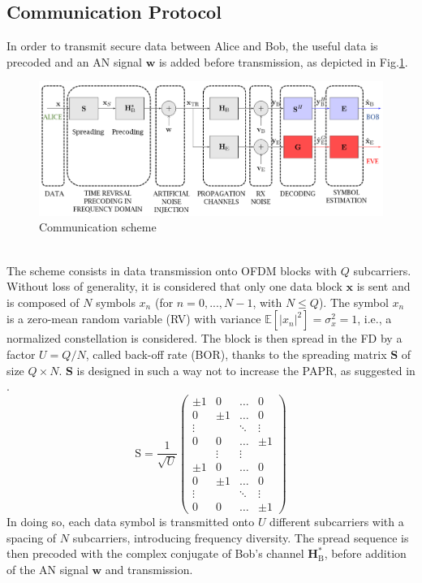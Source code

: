 \documentclass[journal,comsoc]{IEEEtran}
\let\MYoriglatexcaption\caption
\renewcommand{\caption}[2][\relax]{\MYoriglatexcaption[#2]{#2}}
\newcommand{\EX}[1]{\mathbb{E} \left[#1\right]}%
\newcommand{\HB}{\textbf{H}_{\text{B}}}
\newcommand{\spread}{\textbf{S}}
\newcommand{\w}{\textbf{w}}
\newcommand{\mat}[1]{\boldsymbol{\mathrm{#1}}}
\begin{document}
\subsection{Communication Protocol}\label{sec:communication-protocol}
In order to transmit secure data between Alice and Bob, the useful data is precoded and an AN signal $\w$ is added before transmission, as depicted in Fig.\ref{fig_com_scheme}.  
\begin{figure}[h!t]
	\centering
	\includegraphics[width=1\linewidth]{graphs/com_scheme_an.PNG}
	\caption{Communication scheme}
	\label{fig_com_scheme}
\end{figure}\\
The scheme consists in data transmission onto OFDM blocks with $Q$ subcarriers. Without loss of generality, it is considered that only one data block $\textbf{x}$ is sent and is composed of $N$ symbols $x_n$ (for $n = 0,..., N-1$, with $N\leq Q$). The symbol $x_n$ is  a zero-mean random variable (RV) with variance $\EX{|x_n|^2} = \sigma_x^2 = 1$, i.e., a normalized constellation is considered. The block is then spread in the FD by a factor $U = Q/N$, called back-off rate (BOR), thanks to the spreading matrix $\spread$ of size $Q\times N$. \textbf{S} is designed in such a way not to increase the PAPR, as suggested in \cite{4394231}.
\begin{equation}
\mat{S} = \frac{1}{\sqrt{U}} 
\begin{pmatrix}
\pm 1 & 0 & \hdots & 0 \\
0 & \pm 1 & \hdots & 0 \\
\vdots & & \ddots & \vdots \\
0 & 0 & \hdots & \pm 1 \\
& \vdots& \vdots& \\
\pm 1 & 0 & \hdots & 0 \\
0 & \pm 1 & \hdots & 0 \\
\vdots & & \ddots & \vdots \\
0 & 0 & \hdots & \pm 1
\end{pmatrix}
\label{eq:spread_mat}
\end{equation}
In doing so, each data symbol is transmitted onto $U$ different subcarriers with a spacing of $N$ subcarriers, introducing frequency diversity. The spread sequence is then precoded with the complex conjugate of Bob's channel $\HB^*$, before addition of the AN signal $\textbf{w}$  and transmission. 
\end{document}
